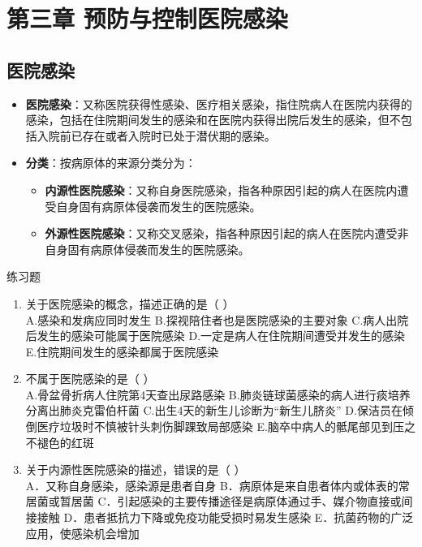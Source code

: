 \documentclass[11pt, a4paper]{ctexart}
\begin{document}
\section{第三章 预防与控制医院感染}
\subsection{医院感染}
\begin{itemize}
	\item \textbf{医院感染}：又称医院获得性感染、医疗相关感染，指住院病人在医院内获得的感染，包括在住院期间发生的感染和在医院内获得出院后发生的感染，但不包括入院前已存在或者入院时已处于潜伏期的感染。
	\item \textbf{分类}：按病原体的来源分类分为：
	      \begin{itemize}
		      \item \textbf{内源性医院感染}：又称自身医院感染，指各种原因引起的病人在医院内遭受自身固有病原体侵袭而发生的医院感染。
		      \item \textbf{外源性医院感染}：又称交叉感染，指各种原因引起的病人在医院内遭受非自身固有病原体侵袭而发生的医院感染。
	      \end{itemize}
\end{itemize}

\begin{examplebox}{练习题}
	\begin{enumerate}
		\item 关于医院感染的概念，描述正确的是（ ）\\
		      A.感染和发病应同时发生 \quad B.探视陪住者也是医院感染的主要对象 \quad C.病人出院后发生的感染可能属于医院感染 \quad D.一定是病人在住院期间遭受并发生的感染 \quad E.住院期间发生的感染都属于医院感染
		\item 不属于医院感染的是（ ）\\
		      A.骨盆骨折病人住院第4天查出尿路感染 \quad B.肺炎链球菌感染的病人进行痰培养分离出肺炎克雷伯杆菌 \quad C.出生4天的新生儿诊断为“新生儿脐炎” \quad D.保洁员在倾倒医疗垃圾时不慎被针头刺伤脚踝致局部感染 \quad E.脑卒中病人的骶尾部见到压之不褪色的红斑
		\item 关于内源性医院感染的描述，错误的是（ ）\\
		      A．又称自身感染，感染源是患者自身 \quad B．病原体是来自患者体内或体表的常居菌或暂居菌 \quad C．引起感染的主要传播途径是病原体通过手、媒介物直接或间接接触 \quad D．患者抵抗力下降或免疫功能受损时易发生感染 \quad E．抗菌药物的广泛应用，使感染机会增加
	\end{enumerate}
\end{examplebox}
\end{document}
